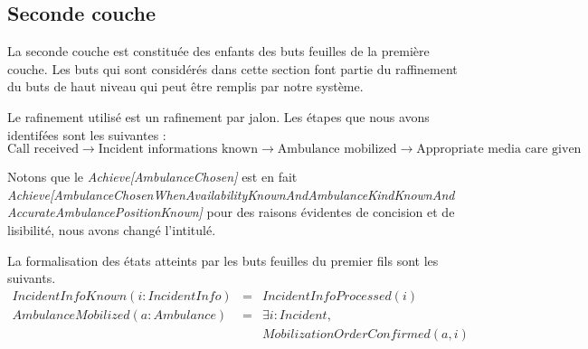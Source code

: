 \subsection{Seconde couche}
	
	La \og seconde couche \fg est constituée des enfants des buts
	feuilles de la première couche. Les buts qui sont considérés dans
	cette section font partie du raffinement du buts de haut niveau
	qui peut être remplis par notre système.
	
	Le rafinement utilisé est un rafinement par jalon. Les étapes que nous
	avons identifées sont les suivantes :
	\begin{equation*}
	\text{Call received} \longrightarrow \text{Incident informations known} \longrightarrow \text{Ambulance mobilized} \longrightarrow \text{Appropriate media care given}
	\end{equation*}
	
	Notons que le \textit{Achieve[AmbulanceChosen]} est en fait
	\textit{Achieve[\-Ambulance\-Chosen\-When\-Availability\-Known\-And\-Ambulance\-Kind\-Known\-And\-Accurate\-Ambulance\-Position\-Known]}
	pour des raisons évidentes de concision et de lisibilité, nous avons 
	changé l'intitulé.

	
	La formalisation des états atteints par les buts feuilles du premier fils sont
	les suivants.
	\singlespacing
	\begin{equation*}
		\begin{array}{rcl}
			IncidentInfoKnown(i:IncidentInfo)  
			& = & IncidentInfoProcessed(i) \\
			
			AmbulanceMobilized(a: Ambulance) 
			& = & \exists i:Incident, \\
			&   & MobilizationOrderConfirmed(a, i) \\
		\end{array}
	\end{equation*}
	\onehalfspacing
	
